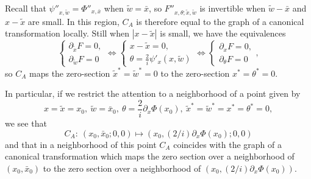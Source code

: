 \documentclass{article}
\begin{document}
\par Recall that $\psi ''_{x,\widetilde{w}}=\Phi ''_{x,\bar{x}}$ when
$\widetilde{w}=\bar{x}$, so
$F''_{x,\theta ;\widetilde{x},\widetilde{w}}$ is invertible when
$\widetilde{w}-\bar{x}$ and $x-\widetilde{x}$ are small. In this
region, $C_A$ is therefore equal to the graph of a canonical
transformation locally. Still when $|x-\widetilde{x}|$ is small, we
have the equivalences
\[
\begin{cases}
  \partial _{\widetilde{x}}F=0,\\ \partial
  _{\widetilde{w}}F=0 \end{cases} \Longleftrightarrow
\begin{cases}x-\widetilde{x}=0,\\ \theta =\frac{2}{i}\psi
  '_x(x,\widetilde{w})\end{cases} \Longleftrightarrow
\begin{cases}\partial _xF=0,\\ \partial _\theta F=0\end{cases} ,
\]
so $C_A$ maps the zero-section $\widetilde{x}^*=\widetilde{w}^*=0$ to
the zero-section $x^*=\theta ^*=0$.

\par In particular, if we restrict the attention to a neighborhood of
a point given by
\[
x=\widetilde{x}=x_0,\ \widetilde{w}=\bar{x}_0,\ \theta
=\frac{2}{i}\partial _x\Phi (x_0),\
\widetilde{x}^*=\widetilde{w}^*=x^*=\theta ^*=0,
\]
we see that
\begin{equation}\label{dsa.16}
  C_A:\ (x_0,\bar{x}_0;0,0)\mapsto (x_0,(2/i)\partial _x\Phi (x_0);0,0)
\end{equation}
and that in a neighborhood of this point $C_A$ coincides with the
graph of a canonical transformation which maps the zero section over a
neighborhood of $(x_0,\bar{x}_0)$ to the zero section over a
neighborhood of $(x_0,(2/i)\partial _x\Phi (x_0))$.


 
\end{document}
